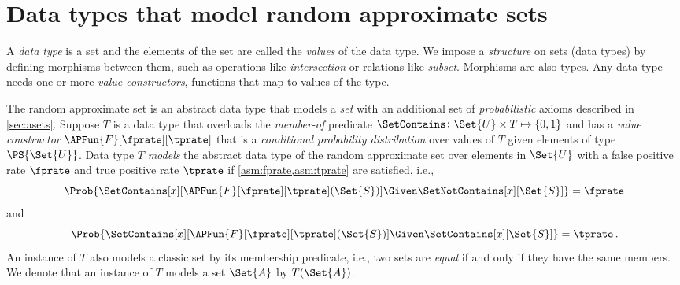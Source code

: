 \documentclass[ ../main.tex]{subfiles}
\newcommand{\ctor}[2]{\APFun{F}[#1][#2]}
\begin{document}
\section{Data types that model random approximate sets}
\label{sec:adt}



A \emph{data type} is a set and the elements of the set are called the \emph{values} of the data type.
We impose a \emph{structure} on sets (data types) by defining morphisms between them, such as operations like \emph{intersection} or relations like \emph{subset}.
Morphisms are also types.
Any data type needs one or more \emph{value constructors}, functions that map to values of the type.


The random approximate set is an abstract data type that models a \emph{set} with an additional set of \emph{probabilistic} axioms described in \cref{sec:asets}.
Suppose $T$ is a data type that overloads the \emph{member-of} predicate $\SetContains \colon \Set{U} \times T \mapsto \{0,1\}$ and has a \emph{value constructor} $\ctor{\fprate}{\tprate}$ that is a \emph{conditional probability distribution} over values of $T$ given elements of type $\PS{\Set{U}}$.
Data type $T$ \emph{models} the abstract data type of the random approximate set over elements in $\Set{U}$ with a false positive rate $\fprate$ and true positive rate $\tprate$ if \cref{asm:fprate,asm:tprate} are satisfied, i.e.,
\begin{equation}
	\Prob{\SetContains[x][\ctor{\fprate}{\tprate}(\Set{S})] \Given \SetNotContains[x][\Set{S}]} = \fprate
\end{equation}
and
\begin{equation}
	\Prob{\SetContains[x][\ctor{\fprate}{\tprate}(\Set{S})] \Given \SetContains[x][\Set{S}]} = \tprate\,.
\end{equation}
An instance of $T$ also models a classic set by its membership predicate, i.e., two sets are \emph{equal} if and only if they have the same members. We denote that an instance of $T$ models a set $\Set{A}$ by $T(\Set{A})$.
\end{document}
